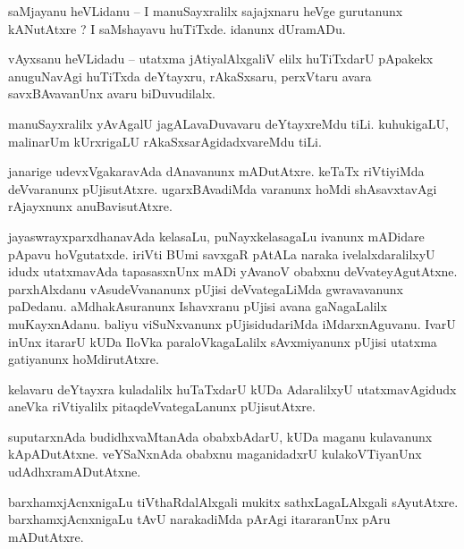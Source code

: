 \documentclass{article}
\begin{document}
\begin{mng}%
saMjayanu heVLidanu -- I manuSayxralilx sajajxnaru heVge gurutanunx kANutAtxre ? I saMshayavu 
huTiTxde. idanunx dUramADu.
\end{mng}

\begin{mng}%
vAyxsanu heVLidadu -- utatxma jAtiyalAlxgaliV elilx huTiTxdarU pApakekx anuguNavAgi huTiTxda 
deYtayxru, rAkaSxsaru, perxVtaru avara savxBAvavanUnx avaru biDuvudilalx.
\end{mng}

\begin{mng}%
manuSayxralilx yAvAgalU jagALavaDuvavaru deYtayxreMdu tiLi. kuhukigaLU, malinarUm kUrxrigaLU 
rAkaSxsarAgidadxvareMdu tiLi.
\end{mng}

\begin{mng}%
janarige udevxVgakaravAda dAnavanunx mADutAtxre. keTaTx riVtiyiMda deVvaranunx pUjisutAtxre. 
ugarxBAvadiMda varanunx hoMdi shAsavxtavAgi rAjayxnunx anuBavisutAtxre.
\end{mng}

\begin{mng}%
jayaswrayxparxdhanavAda kelasaLu, puNayxkelasagaLu ivanunx mADidare pApavu hoVgutatxde. iriVti 
BUmi savxgaR pAtALa naraka ivelalxdaralilxyU idudx utatxmavAda tapasasxnUnx mADi yAvanoV obabxnu 
deVvateyAgutAtxne. parxhAlxdanu vAsudeVvananunx pUjisi deVvategaLiMda gwravavanunx paDedanu. 
aMdhakAsuranunx Ishavxranu pUjisi avana gaNagaLalilx muKayxnAdanu. baliyu viSuNxvanunx 
pUjisidudariMda iMdarxnAguvanu. IvarU inUnx itararU kUDa IloVka paraloVkagaLalilx sAvxmiyanunx 
pUjisi utatxma gatiyanunx hoMdirutAtxre.
\end{mng}

\begin{mng}%
kelavaru deYtayxra kuladalilx huTaTxdarU kUDa AdaralilxyU utatxmavAgidudx aneVka riVtiyalilx 
pitaqdeVvategaLanunx pUjisutAtxre.
\end{mng}

\begin{mng}%
suputarxnAda budidhxvaMtanAda obabxbAdarU, kUDa maganu kulavanunx kApADutAtxne. veYSaNxnAda 
obabxnu maganidadxrU kulakoVTiyanUnx udAdhxramADutAtxne.
\end{mng}

\begin{mng}%
barxhamxjAcnxnigaLu tiVthaRdalAlxgali mukitx sathxLagaLAlxgali sAyutAtxre. barxhamxjAcnxnigaLu 
tAvU narakadiMda pArAgi itararanUnx pAru mADutAtxre.
\end{mng}
\end{document}
